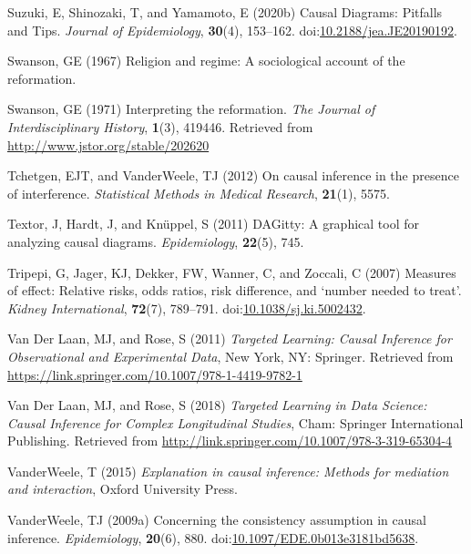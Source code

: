 \documentclass[
  singlecolumn,
  9pt]{article}
\begin{document}
\begin{CSLReferences}
Suzuki, E, Shinozaki, T, and Yamamoto, E (2020b) Causal Diagrams:
Pitfalls and Tips. \emph{Journal of Epidemiology}, \textbf{30}(4),
153--162.
doi:\href{https://doi.org/10.2188/jea.JE20190192}{10.2188/jea.JE20190192}.

Swanson, GE (1967) Religion and regime: A sociological account of the
reformation.

Swanson, GE (1971) Interpreting the reformation. \emph{The Journal of
Interdisciplinary History}, \textbf{1}(3), 419446. Retrieved from
\url{http://www.jstor.org/stable/202620}

Tchetgen, EJT, and VanderWeele, TJ (2012) On causal inference in the
presence of interference. \emph{Statistical Methods in Medical
Research}, \textbf{21}(1), 5575.

Textor, J, Hardt, J, and Knüppel, S (2011) DAGitty: A graphical tool for
analyzing causal diagrams. \emph{Epidemiology}, \textbf{22}(5), 745.

Tripepi, G, Jager, KJ, Dekker, FW, Wanner, C, and Zoccali, C (2007)
Measures of effect: Relative risks, odds ratios, risk difference, and
{`}number needed to treat{'}. \emph{Kidney International},
\textbf{72}(7), 789--791.
doi:\href{https://doi.org/10.1038/sj.ki.5002432}{10.1038/sj.ki.5002432}.

Van Der Laan, MJ, and Rose, S (2011) \emph{Targeted Learning: Causal
Inference for Observational and Experimental Data}, New York, NY:
Springer. Retrieved from
\url{https://link.springer.com/10.1007/978-1-4419-9782-1}

Van Der Laan, MJ, and Rose, S (2018) \emph{Targeted Learning in Data
Science: Causal Inference for Complex Longitudinal Studies}, Cham:
Springer International Publishing. Retrieved from
\url{http://link.springer.com/10.1007/978-3-319-65304-4}

VanderWeele, T (2015) \emph{Explanation in causal inference: Methods for
mediation and interaction}, Oxford University Press.

VanderWeele, TJ (2009a) Concerning the consistency assumption in causal
inference. \emph{Epidemiology}, \textbf{20}(6), 880.
doi:\href{https://doi.org/10.1097/EDE.0b013e3181bd5638}{10.1097/EDE.0b013e3181bd5638}.


\end{CSLReferences}
\end{document}
